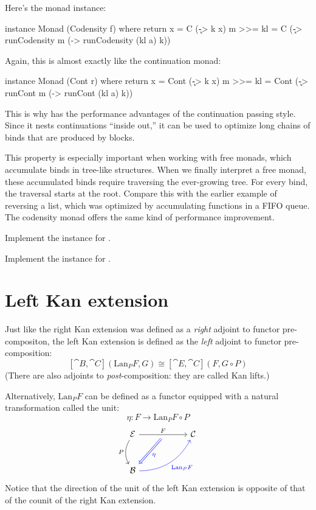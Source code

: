 \documentclass[DaoFP]{subfiles}
\begin{document}
Here's the monad instance:
 \begin{haskell}
instance Monad (Codensity f) where
  return x = C (\k -> k x)
  m >>= kl = C (\k -> runCodensity m (\a -> runCodensity (kl a) k))
 \end{haskell}
 Again, this is almost exactly like the continuation monad:
 \begin{haskell}
instance Monad (Cont r) where
  return x = Cont (\k -> k x)
  m >>= kl = Cont (\k -> runCont m (\a -> runCont (kl a) k))
\end{haskell}
This is why  has the performance advantages of the continuation passing style. Since it nests continuations ``inside out,'' it can be used to optimize long chains of binds that are produced by  blocks. 

This property is especially important when working with free monads, which accumulate binds in tree-like structures. When we finally interpret a free monad, these accumulated binds require traversing the ever-growing tree. For every bind, the traversal starts at the root. Compare this with the earlier example of reversing a list, which was optimized by accumulating functions in a FIFO queue. The codensity monad offers the same kind of performance improvement.

\begin{exercise}
Implement the  instance for .
\end{exercise}
\begin{exercise}
Implement the  instance for .
\end{exercise}

\section{Left Kan extension}

Just like the right Kan extension was defined as a \emph{right} adjoint to functor pre-compositon, the left Kan extension is defined as the \emph{left} adjoint to functor pre-composition:
\[ [\cat B, \cat C](\text{Lan}_P F , G) \cong  [\cat E, \cat C] (F, G \circ P) \]
 (There are also adjoints to \emph{post}-composition: they are called Kan lifts.)

Alternatively, $\text{Lan}_P F$ can be defined as a functor equipped with a natural transformation called the unit:
\[ \eta \colon F \to \text{Lan}_P F \circ P \]
\[
 \begin{tikzcd} [row sep=1cm, column sep=1cm]
 \cat E
 \arrow[rr, "F", "" {name=ID, below} ]
 \arrow[d, bend right, "P"']
 && \cat C
 \\
 \cat B
  \arrow[urr, blue, bend right, "\text{Lan}_P F"']
 \arrow[Rightarrow, blue, "\eta",  from=ID]
 \end{tikzcd}
\]
Notice that the direction of the unit of the left Kan extension is opposite of that of the counit of the right Kan extension.
\end{document}
